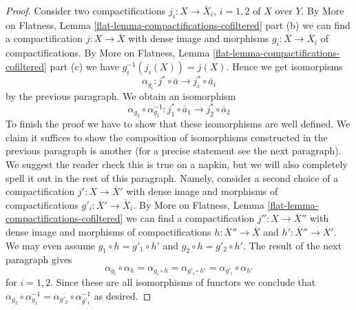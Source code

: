 \documentclass{stacks-project}
\theoremstyle{plain}
\theoremstyle{definition}
\theoremstyle{remark}
\numberwithin{equation}{subsection}
\begin{document}
\begin{proof}
\medskip\noindent
Consider two compactifications $j_i : X \to \overline{X}_i$, $i = 1, 2$
of $X$ over $Y$. By More on Flatness, Lemma
\ref{flat-lemma-compactifications-cofiltered} part (b)
we can find a compactification $j : X \to \overline{X}$
with dense image and morphisms
$g_i : \overline{X} \to \overline{X}_i$ of compactifications.
By More on Flatness, Lemma
\ref{flat-lemma-compactifications-cofiltered} part (c)
we have $g_i^{-1}(j_i(X)) = j(X)$. Hence we get isomorpisms
$$
\alpha_{g_i} :
j^* \circ \overline{a}
\longrightarrow
j_i^* \circ \overline{a}_i
$$
by the previous paragraph. We obtain an isomorphism
$$
\alpha_{g_2} \circ \alpha_{g_1}^{-1} :
j_1^* \circ \overline{a}_1 \to j_2^* \circ \overline{a}_2
$$
To finish the proof we have to show that these isomorphisms are well defined.
We claim it suffices to show the composition of isomorphisms constructed
in the previous paragraph is another (for a precise statement see the next
paragraph). We suggest the reader check this is true on a napkin, but we
will also completely spell it out in the rest of this paragraph.
Namely, consider a second choice of a compactification
$j' : X \to \overline{X}'$ with dense image
and morphisms of compactifications $g'_i : \overline{X}' \to \overline{X}_i$.
By More on Flatness, Lemma \ref{flat-lemma-compactifications-cofiltered}
we can find a compactification $j'' : X \to \overline{X}''$
with dense image and morphisms of compactifications
$h : \overline{X}'' \to \overline{X}$ and
$h' : \overline{X}'' \to \overline{X}'$. We may even assume
$g_1 \circ h = g'_1 \circ h'$ and $g_2 \circ h = g'_2 \circ h'$.
The result of the next paragraph gives
$$
\alpha_{g_i} \circ \alpha_h = \alpha_{g_i \circ h} =
\alpha_{g'_i \circ h'} = \alpha_{g'_i} \circ \alpha_{h'}
$$
for $i = 1, 2$. Since these are all isomorphisms of functors
we conclude that $\alpha_{g_2} \circ \alpha_{g_1}^{-1} =
\alpha_{g'_2} \circ \alpha_{g'_1}^{-1}$ as desired.


\end{proof}
\end{document}
